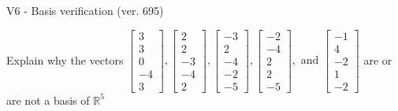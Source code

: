 \begin{exercise}
  \begin{exerciseTitle}V6 - Basis verification (ver. 695)\end{exerciseTitle}
  \begin{exerciseStatement}
    Explain why the vectors \(\left[\begin{array}{r}
3 \\
3 \\
0 \\
-4 \\
3
\end{array}\right] , \left[\begin{array}{r}
2 \\
2 \\
-3 \\
-4 \\
2
\end{array}\right] , \left[\begin{array}{r}
-3 \\
2 \\
-4 \\
-2 \\
-5
\end{array}\right] , \left[\begin{array}{r}
-2 \\
-4 \\
2 \\
2 \\
-5
\end{array}\right] , \text{ and } \left[\begin{array}{r}
-1 \\
4 \\
-2 \\
1 \\
-2
\end{array}\right]\) are or are not a basis of \(\mathbb{R}^5\)	



\end{exerciseStatement}
\end{exercise}
